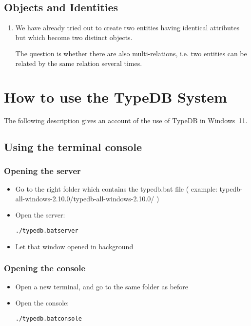 \documentclass{article}
\begin{document}
\subsection{Objects and Identities}

\begin{enumerate}
\item We have already tried out to create two entities having identical
  attributes but which become two distinct objects.

  The question is whether there are also multi-relations, i.e. two entities
  can be related by the same relation several times.
\end{enumerate}




\section{How to use the TypeDB System}

The following description gives an account of the use of TypeDB in Windows~11.

\subsection{Using the terminal console}


\subsubsection{Opening the server}

\begin{itemize}
\item Go to the right folder which contains the typedb.bat file ( example: typedb-all-windows-2.10.0/typedb-all-windows-2.10.0/ )
\item Open the server: \begin{alltt}./typedb.bat server \end{alltt}
\item Let that window opened in background
\end{itemize}

\subsubsection{Opening the console}
\begin{itemize}
\item Open a new terminal, and go to the same folder as before
\item Open the console:   \begin{alltt}./typedb.bat console\end{alltt}     
\end{itemize}
\end{document}

